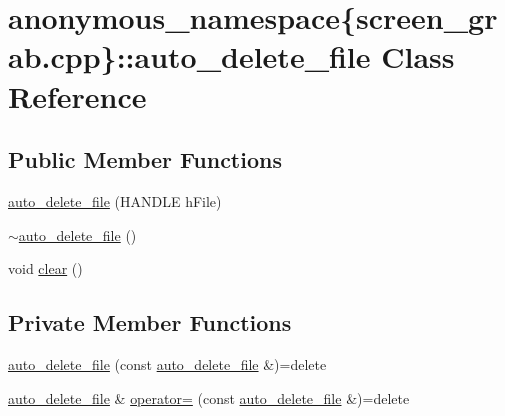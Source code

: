 \hypertarget{classanonymous__namespace_02screen__grab_8cpp_03_1_1auto__delete__file}{}\section{anonymous\+\_\+namespace\{screen\+\_\+grab.\+cpp\}\+:\+:auto\+\_\+delete\+\_\+file Class Reference}
\label{classanonymous__namespace_02screen__grab_8cpp_03_1_1auto__delete__file}
\subsection*{Public Member Functions}
\begin{DoxyCompactItemize}
\item 
\mbox{\hyperlink{classanonymous__namespace_02screen__grab_8cpp_03_1_1auto__delete__file_a059bc8ce7bd320e4ca0e28687a9c16d7}{auto\+\_\+delete\+\_\+file}} (H\+A\+N\+D\+LE h\+File)
\item 
\mbox{\hyperlink{classanonymous__namespace_02screen__grab_8cpp_03_1_1auto__delete__file_a43ceca0705f7a8421bdb20fdfb800f27}{$\sim$auto\+\_\+delete\+\_\+file}} ()
\item 
void \mbox{\hyperlink{classanonymous__namespace_02screen__grab_8cpp_03_1_1auto__delete__file_a489c021c4d3a19e0ab16570d29a40b0a}{clear}} ()
\end{DoxyCompactItemize}
\subsection*{Private Member Functions}
\begin{DoxyCompactItemize}
\item 
\mbox{\hyperlink{classanonymous__namespace_02screen__grab_8cpp_03_1_1auto__delete__file_a54437dd7e4f6a8b1cd50ab79b0e57812}{auto\+\_\+delete\+\_\+file}} (const \mbox{\hyperlink{classanonymous__namespace_02screen__grab_8cpp_03_1_1auto__delete__file}{auto\+\_\+delete\+\_\+file}} \&)=delete
\item 
\mbox{\hyperlink{classanonymous__namespace_02screen__grab_8cpp_03_1_1auto__delete__file}{auto\+\_\+delete\+\_\+file}} \& \mbox{\hyperlink{classanonymous__namespace_02screen__grab_8cpp_03_1_1auto__delete__file_a8a66a15c610a12eab552b639669daa35}{operator=}} (const \mbox{\hyperlink{classanonymous__namespace_02screen__grab_8cpp_03_1_1auto__delete__file}{auto\+\_\+delete\+\_\+file}} \&)=delete
\end{DoxyCompactItemize}
